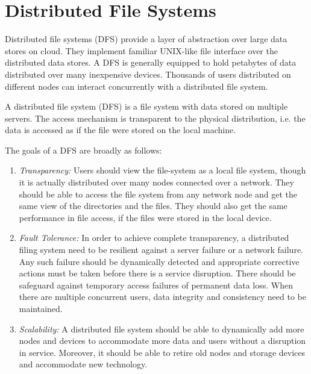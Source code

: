\section{Distributed File Systems}
\label{sec:bigdata:dfs}

Distributed file systems (DFS) provide a layer of abstraction over large data stores on cloud. They implement familiar UNIX-like
file interface over the distributed data stores. A DFS is generally equipped to hold petabytes of data distributed over many inexpensive
devices. Thousands of users distributed on different nodes can interact concurrently with a distributed file system. 

\begin{definition}
	A distributed file system (DFS) is a file system with data stored on multiple servers. The access mechanism is transparent
	to the physical distribution, i.e. the data is accessed as if the file were stored on the local machine.
\end{definition}
%
The goals of a DFS are broadly as follows:

\begin{enumerate}
	\item {\em Transparency:} Users should view the file-system as a local file system, though it is actually distributed
		over many nodes connected over a network. They should be able to access the file system from any network node
		and get the same view of the directories and the files. They should also get the same performance in file access, 
		if the files were stored in the local device.
	\item {\em Fault Tolerance:} In order to achieve complete transparency, a distributed filing system need to be resilient
		against a server failure or a network failure. Any such failure should be dynamically detected and appropriate
		corrective actions must be taken before there is a service disruption. There should be safeguard against temporary 
		access failures of permanent data loss. When there are multiple concurrent users, data integrity and consistency 
		need to be maintained.
	\item {\em Scalability:} A distributed file system should be able to dynamically add more nodes and devices to accommodate
		more data and users without a disruption in service. Moreover, it should be able to retire old nodes and storage 
		devices and accommodate new technology.
\end{enumerate}

